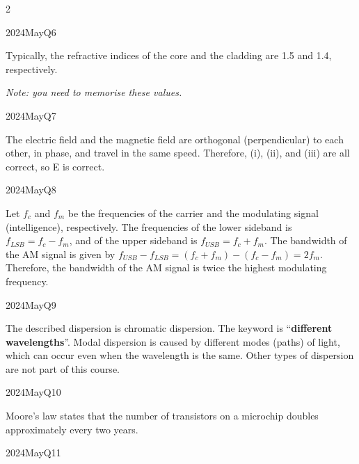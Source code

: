 \begin{multicols}{2}
\begin{qsolution}{2024}{May}{Q6}{\tgElectronics \tgElectronicsFibreOptics}

    Typically, the refractive indices of the core and the cladding are 1.5 and 1.4, respectively.

    {\itshape
        Note: you need to memorise these values.
    }
\end{qsolution}

\begin{qsolution}{2024}{May}{Q7}{\tgElectronics \tgElectronicsEM}

    The electric field and the magnetic field are orthogonal (perpendicular) to each other, in phase, and travel in the same speed.
    Therefore, (i), (ii), and (iii) are all correct, so E is correct.
\end{qsolution}

\begin{qsolution}{2024}{May}{Q8}{\tgElectronics \tgElectronicsAM}

    Let $f_c$ and $f_m$ be the frequencies of the carrier and the modulating signal (intelligence), respectively.
    The frequencies of the lower sideband is $f_{LSB}=f_c-f_m$, and of the upper sideband is $f_{USB}=f_c+f_m$.
    The bandwidth of the AM signal is given by $f_{USB}-f_{LSB}=(f_c+f_m)-(f_c-f_m)=2f_m$.
    Therefore, the bandwidth of the AM signal is twice the highest modulating frequency.
\end{qsolution}

\begin{qsolution}{2024}{May}{Q9}{\tgElectronics \tgElectronicsFibreOptics}

    The described dispersion is chromatic dispersion.
    The keyword is ``\textbf{different wavelengths}''.
    Modal dispersion is caused by different modes (paths) of light, which can occur even when the wavelength is the same.
    Other types of dispersion are not part of this course.
\end{qsolution}

\begin{qsolution}{2024}{May}{Q10}{\tgElectronics \tgElectronicsSemiconductor}

    Moore's law states that the number of transistors on a microchip doubles approximately every two years.
\end{qsolution}

\begin{qsolution}{2024}{May}{Q11}{\tgCE}


\end{qsolution}
\end{multicols}
